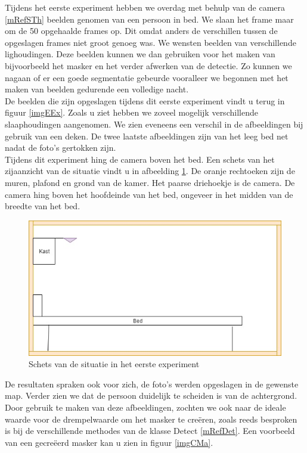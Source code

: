 Tijdens het eerste experiment hebben we overdag met behulp van de camera \ref{mRefSTh} beelden genomen van een persoon in bed. We slaan het frame maar om de 50 opgehaalde frames op. Dit omdat anders de verschillen tussen de opgeslagen frames niet groot genoeg was. We wensten beelden van verschillende lighoudingen.  Deze beelden kunnen we dan gebruiken voor het maken van bijvoorbeeld het masker en het verder afwerken van de detectie. Zo kunnen we nagaan of er een goede segmentatie gebeurde vooralleer we begonnen met het maken van beelden gedurende een volledige nacht.\\
De beelden die zijn opgeslagen tijdens dit eerste experiment vindt u terug in figuur \ref{imgEEx}. Zoals u ziet hebben we zoveel mogelijk verschillende slaaphoudingen aangenomen. We zien eveneens een verschil in de afbeeldingen bij gebruik van een deken. De twee laatste afbeeldingen zijn van het leeg bed net nadat de foto's gertokken zijn. \\
Tijdens dit experiment hing de camera boven het bed. Een schets van het zijaanzicht van de situatie vindt u in afbeelding \ref{imgEEx2}. De oranje rechtoeken zijn de muren, plafond en grond van de kamer. Het paarse driehoekje is de camera. De camera hing boven het hoofdeinde van het bed, ongeveer in het midden van de breedte van het bed. \\
\begin{figure}[hbp]
	\includegraphics[scale=0.5]{SchetsExperiment1}
	\caption{Schets van de situatie in het eerste experiment}
	\label{imgEEx2}
\end{figure}
De resultaten spraken ook voor zich, de foto's werden opgeslagen in de gewenste map. Verder zien we dat de persoon duidelijk te scheiden is van de achtergrond. Door gebruik te maken van deze afbeeldingen, zochten we ook naar de ideale waarde voor de drempelwaarde om het masker te cre\"eren, zoals reeds besproken is bij de verschillende methodes van de klasse Detect \ref{mRefDet}. Een voorbeeld van een gecre\"eerd masker kan u zien in figuur \ref{imgCMa}.

